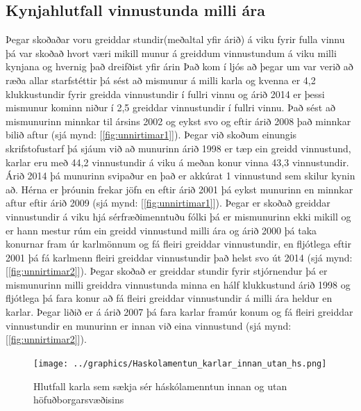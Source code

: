 \documentclass[12pt, git, draft]{rureport}
\begin{document}
\subsection{Kynjahlutfall vinnustunda milli ára}
Þegar skoðaðar voru greiddar stundir(meðaltal yfir árið) á viku fyrir fulla vinnu þá var skoðað hvort væri mikill munur á greiddum vinnustundum á viku milli kynjana og hvernig það dreifðist yfir árin
Það kom í ljós að þegar um var verið að ræða allar starfstéttir þá sést að mismunur á milli karla og kvenna er 4,2 klukkustundir fyrir greidda vinnustundir í fullri vinnu og árið 2014 er þessi mismunur kominn niður í 2,5 greiddar vinnustundir í fullri vinnu.
Það sést að mismunurinn minnkar til ársins 2002 og eykst svo og eftir árið 2008 það minnkar bilið aftur (sjá mynd: [\ref{fig:unnirtimar1}]). 
\newline
\newline
Þegar við skoðum einungis skrifstofustarf þá sjáum við að munurinn árið 1998 er tæp ein greidd vinnustund, karlar eru með 44,2 vinnustundir á viku á meðan konur vinna 43,3 vinnustundir. Árið 2014 þá munurinn svipaður en það er akkúrat 1 vinnustund sem skilur kynin að.
Hérna er þróunin frekar jöfn en eftir árið 2001 þá eykst munurinn en minnkar aftur eftir árið 2009 (sjá mynd: [\ref{fig:unnirtimar1}]).
\newline
\newline
Þegar er skoðað greiddar vinnustundir á viku hjá sérfræðimenntuðu fólki þá er mismunurinn ekki mikill og er hann mestur rúm ein greidd vinnustund milli ára og árið 2000 þá taka konurnar fram úr karlmönnum og fá fleiri greiddar vinnustundir, en fljótlega eftir 2001 þá fá karlmenn fleiri greiddar vinnustundir það helst svo út 2014 (sjá mynd: [\ref{fig:unnirtimar2}]).
\newline
\newline
Þegar skoðað er greiddar stundir fyrir stjórnendur þá er mismunurinn milli greiddra vinnustunda minna en hálf klukkustund árið 1998 og fljótlega þá fara konur að fá fleiri greiddar vinnustundir á milli ára heldur en karlar. Þegar liðið er á árið 2007 þá fara karlar framúr konum og fá fleiri greiddar vinnustundir en munurinn er innan við eina vinnustund (sjá mynd: [\ref{fig:unnirtimar2}]). 



\begin{figure}
	\centering 
	\texttt{[image: ../graphics/Haskolamentun\_karlar\_innan\_utan\_hs.png]}
	\caption{Hlutfall karla sem sækja sér háskólamenntun innan og utan höfuðborgarsvæðisins \label{fig:menntukarla}}
\end{figure}
\end{document}
